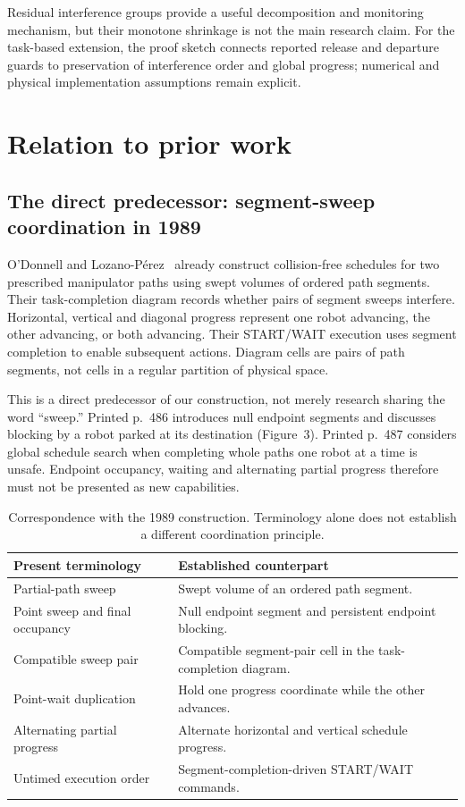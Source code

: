 \documentclass[11pt,a4paper]{article}
\theoremstyle{remark}
\begin{document}
Residual interference groups provide a useful decomposition and monitoring
mechanism, but their monotone shrinkage is not the main research claim.
For the task-based extension, the proof sketch connects reported release
and departure guards to preservation of interference order and global
progress; numerical and physical implementation assumptions remain explicit.

\section{Relation to prior work}
\label{sec:prior-art}

\subsection{The direct predecessor: segment-sweep coordination in 1989}
O'Donnell and Lozano-P\'erez~\cite{odonnell1989} already construct
collision-free schedules for two prescribed manipulator paths using swept
volumes of ordered path segments. Their task-completion diagram records
whether pairs of segment sweeps interfere. Horizontal, vertical and diagonal
progress represent one robot advancing, the other advancing, or both
advancing. Their START/WAIT execution uses segment completion to enable
subsequent actions. Diagram cells are pairs of path segments, not cells
in a regular partition of physical space.

This is a direct predecessor of our construction, not merely research sharing
the word ``sweep.'' Printed p.~486 introduces null endpoint segments and
discusses blocking by a robot parked at its destination (Figure~3).
Printed p.~487 considers global schedule search when completing whole paths
one robot at a time is unsafe. Endpoint occupancy, waiting and alternating
partial progress therefore must not be presented as new capabilities.

\begin{table}[htbp]
\centering\small
\caption{Correspondence with the 1989 construction. Terminology alone does
not establish a different coordination principle.}
\label{tab:1989-correspondence}
\begin{tabular}{p{.29\linewidth}p{.62\linewidth}}
\toprule
Present terminology & Established counterpart~\cite{odonnell1989}\\\midrule
Partial-path sweep & Swept volume of an ordered path segment.\\[3pt]
Point sweep and final occupancy & Null endpoint segment and persistent endpoint blocking.\\[3pt]
Compatible sweep pair & Compatible segment-pair cell in the task-completion diagram.\\[3pt]
Point-wait duplication & Hold one progress coordinate while the other advances.\\[3pt]
Alternating partial progress & Alternate horizontal and vertical schedule progress.\\[3pt]
Untimed execution order & Segment-completion-driven START/WAIT commands.\\
\bottomrule
\end{tabular}
\end{table}
\end{document}
